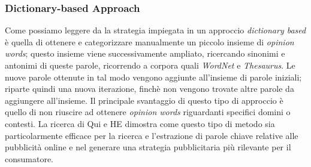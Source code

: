 \documentclass[a4paper,12pt,openright,twoside]{report}
\theoremstyle{definition}
\begin{document}
\subsubsection{Dictionary-based Approach}
Come possiamo leggere da %
la strategia impiegata in un approccio \emph{dictionary based} è quella di ottenere e categorizzare
manualmente un piccolo insieme di \emph{opinion words}; questo insieme
viene successivamente ampliato, ricercando sinonimi e antonimi di queste parole,
ricorrendo a corpora quali \emph{WordNet}
e \emph{Thesaurus}.
Le nuove parole ottenute in tal modo vengono aggiunte all'insieme di parole iniziali;
riparte quindi una nuova iterazione, finchè non 
vengono trovate altre parole da aggiungere all'insieme.
Il principale svantaggio di questo tipo di approccio è quello di non riuscire ad ottenere \emph{opinion words}
riguardanti specifici domini o contesti.
La ricerca di Qui e HE %
dimostra come questo tipo di metodo sia particolarmente efficace per la ricerca e l'estrazione di parole
chiave relative alle pubblicità online e nel generare una strategia pubblicitaria più rilevante per il
consumatore.
\end{document}

